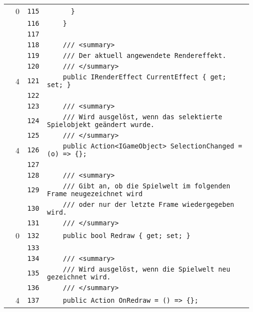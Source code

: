 \documentclass[a4paper,10pt]{article}
\begin{document}
\begin{longtable}[l]{lrrl}
\cellcolor{red} & 0 & \verb~115~ & \verb~      }~\\
\cellcolor{gray} &  & \verb~116~ & \verb~    }~\\
\cellcolor{gray} &  & \verb~117~ & \verb~~\\
\cellcolor{gray} &  & \verb~118~ & \verb~    /// <summary>~\\
\cellcolor{gray} &  & \verb~119~ & \verb~    /// Der aktuell angewendete Rendereffekt.~\\
\cellcolor{gray} &  & \verb~120~ & \verb~    /// </summary>~\\
\cellcolor{green} & 4 & \verb~121~ & \verb~    public IRenderEffect CurrentEffect { get; set; }~\\
\cellcolor{gray} &  & \verb~122~ & \verb~~\\
\cellcolor{gray} &  & \verb~123~ & \verb~    /// <summary>~\\
\cellcolor{gray} &  & \verb~124~ & \verb~    /// Wird ausgelöst, wenn das selektierte Spielobjekt geändert wurde.~\\
\cellcolor{gray} &  & \verb~125~ & \verb~    /// </summary>~\\
\cellcolor{green} & 4 & \verb~126~ & \verb~    public Action<IGameObject> SelectionChanged = (o) => {};~\\
\cellcolor{gray} &  & \verb~127~ & \verb~~\\
\cellcolor{gray} &  & \verb~128~ & \verb~    /// <summary>~\\
\cellcolor{gray} &  & \verb~129~ & \verb~    /// Gibt an, ob die Spielwelt im folgenden Frame neugezeichnet wird~\\
\cellcolor{gray} &  & \verb~130~ & \verb~    /// oder nur der letzte Frame wiedergegeben wird.~\\
\cellcolor{gray} &  & \verb~131~ & \verb~    /// </summary>~\\
\cellcolor{red} & 0 & \verb~132~ & \verb~    public bool Redraw { get; set; }~\\
\cellcolor{gray} &  & \verb~133~ & \verb~~\\
\cellcolor{gray} &  & \verb~134~ & \verb~    /// <summary>~\\
\cellcolor{gray} &  & \verb~135~ & \verb~    /// Wird ausgelöst, wenn die Spielwelt neu gezeichnet wird.~\\
\cellcolor{gray} &  & \verb~136~ & \verb~    /// </summary>~\\
\cellcolor{green} & 4 & \verb~137~ & \verb~    public Action OnRedraw = () => {};~\\

\end{longtable}
\end{document}
